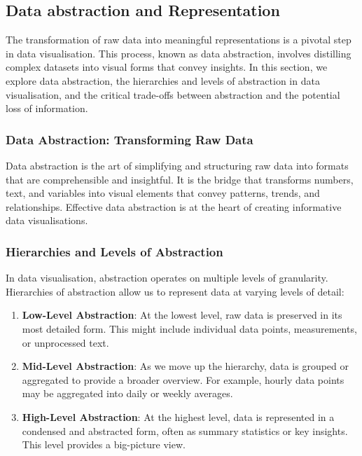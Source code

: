 \documentclass{article}\usepackage[]{graphicx}\usepackage[]{xcolor}
\begin{document}
\subsection{Data abstraction and Representation}
The transformation of raw data into meaningful representations is a pivotal step in data visualisation. This process, known as data abstraction, involves distilling complex datasets into visual forms that convey insights. In this section, we explore data abstraction, the hierarchies and levels of abstraction in data visualisation, and the critical trade-offs between abstraction and the potential loss of information.

\subsubsection{Data Abstraction: Transforming Raw Data}
Data abstraction is the art of simplifying and structuring raw data into formats that are comprehensible and insightful. It is the bridge that transforms numbers, text, and variables into visual elements that convey patterns, trends, and relationships. Effective data abstraction is at the heart of creating informative data visualisations.

\subsubsection{Hierarchies and Levels of Abstraction}
In data visualisation, abstraction operates on multiple levels of granularity. Hierarchies of abstraction allow us to represent data at varying levels of detail: 
\begin{enumerate}
    \item \textbf{Low-Level Abstraction}: At the lowest level, raw data is preserved in its most detailed form. This might include individual data points, measurements, or unprocessed text.
    \item \textbf{Mid-Level Abstraction}: As we move up the hierarchy, data is grouped or aggregated to provide a broader overview. For example, hourly data points may be aggregated into daily or weekly averages.
    \item \textbf{High-Level Abstraction}: At the highest level, data is represented in a condensed and abstracted form, often as summary statistics or key insights. This level provides a big-picture view.
\end{enumerate}
\end{document}
